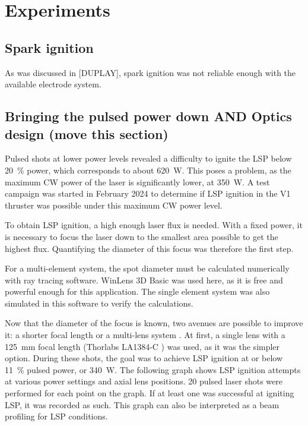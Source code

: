 \chapter{Experiments}

    \section{Spark ignition}
        
        As was discussed in [DUPLAY], spark ignition was not reliable enough with the available electrode system. 

    \section{Bringing the pulsed power down AND Optics design (move this section)} \label{sec:design_optics}
        
        Pulsed shots at lower power levels revealed a difficulty to ignite the LSP below \qty{20}{\%} power, which corresponds to about \qty{620}{W}. This poses a problem, as the maximum CW power of the laser is significantly lower, at \qty{350}{W}. A test campaign was started in February 2024 to determine if LSP ignition in the V1 thruster was possible under this maximum CW power level.
        
        To obtain LSP ignition, a high enough laser flux is needed. With a fixed power, it is necessary to focus the laser down to the smallest area possible to get the highest flux. Quantifying the diameter of this focus was therefore the first step. 


        For a multi-element system, the spot diameter must be calculated numerically with ray tracing software. WinLens 3D Basic \cite{winlens} was used here, as it is free and powerful enough for this application. The single element system was also simulated in this software to verify the calculations.

        Now that the diameter of the focus is known, two avenues are possible to improve it: a shorter focal length or a multi-lens system \cite{thorlabs}. At first, a single lens with a \qty{125}{mm} focal length (Thorlabs LA1384-C \cite{125mm lens}) was used, as it was the simpler option. During these shots, the goal was to achieve LSP ignition at or below \qty{11}{\%} pulsed power, or \qty{340}{W}. The following graph shows LSP ignition attempts at various power settings and axial lens positions. 20 pulsed laser shots were performed for each point on the graph. If at least one was successful at igniting LSP, it was recorded as such. This graph can also be interpreted as a beam profiling for LSP conditions.
        
